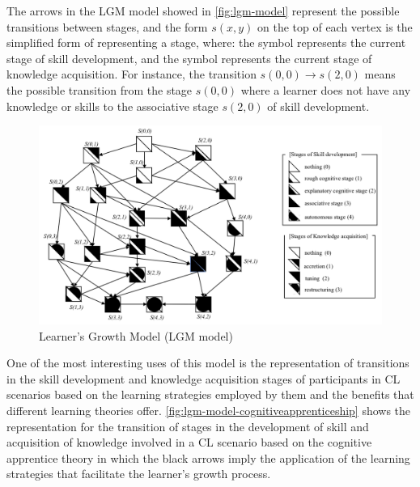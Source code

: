 The arrows in the LGM model showed in \autoref{fig:lgm-model} represent the possible transitions between stages, and the form $s(x,y)$ on the top of each vertex is the simplified form of representing a stage, where: the symbol  represents the current stage of skill development, and the symbol  represents the current stage of knowledge acquisition.
For instance, the transition $s(0,0) \to s(2,0)$ means the possible transition from the stage $s(0,0)$ where a learner does not have any knowledge or skills to the associative stage $s(2,0)$ of skill development.

 \begin{figure}[htb]
 \caption{Learner’s Growth Model (LGM model)}
 \label{fig:lgm-model}
 \centering
 \includegraphics[width=1\textwidth]{images/chap-model-gmif/lgm-model.png}
\end{figure}

One of the most interesting uses of this model is the representation of transitions in the skill development and knowledge acquisition stages of participants in CL scenarios based on the learning strategies employed by them and the benefits that different learning theories offer.
\autoref{fig:lgm-model-cognitiveapprenticeship} shows the representation for the transition of stages in the development of skill and acquisition of knowledge involved in a CL scenario based on the cognitive apprentice theory in which the black arrows imply the application of the learning strategies that facilitate the learner’s growth process.

